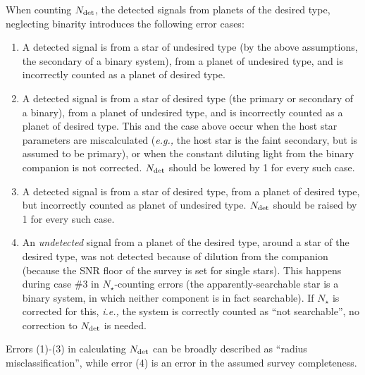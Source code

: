 \documentclass{emulateapj}
\begin{document}
When counting $N_{\rm det}$, the detected signals from planets of the desired 
type, neglecting binarity introduces the following error cases:
\begin{enumerate}
\item 
A detected signal is from a star of undesired type (by the above assumptions, 
the secondary of a binary system), from a planet of undesired type, and is 
incorrectly counted as a planet of desired type.
%
\item
A detected signal is from a star of desired type (the primary or secondary of 
a binary), from a planet of undesired type, and is incorrectly counted 
as a planet of desired type.
This and the case above occur when the host star parameters are miscalculated 
({\it e.g.,} the host star is the faint secondary, but is assumed to be 
primary), or when the constant diluting light from the binary companion is not 
corrected.
$N_{\rm det}$ should be lowered by 1 for every such case.
%
\item
A detected signal is from a star of desired type, from a planet of desired 
type, but incorrectly counted as planet of undesired type.
$N_{\rm det}$ should be raised by 1 for every such case.
\item
An {\it undetected} signal from a planet of the desired type, around a star of 
the desired type, was not detected because of dilution from the companion 
(because the SNR floor of the survey is set for single stars). 
This happens during case \#3 in $N_\star$-counting errors (the 
apparently-searchable star is a binary system, in which neither component is 
in fact searchable). If $N_\star$ is corrected for this, {\it i.e.,} the 
system is correctly counted as ``not searchable'', no correction to $N_{\rm 
det}$ is needed.
\end{enumerate}

Errors (1)-(3) in calculating $N_{\rm det}$ can be broadly described as 
``radius misclassification'', while error (4) is an error in the assumed 
survey completeness.
\end{document}
